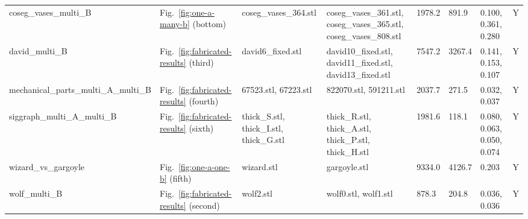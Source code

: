 \begin{tabular}{lllllll}
coseg\_vases\_multi\_B & Fig.~\ref{fig:one-a-many-b} (bottom) & coseg\_vases\_364.stl & coseg\_vases\_361.stl, coseg\_vases\_365.stl, coseg\_vases\_808.stl & 1978.2 & 891.9 & 0.100, 0.361, 0.280 & Y \\
david\_multi\_B & Fig.~\ref{fig:fabricated-results} (third) & david6\_fixed.stl & david10\_fixed.stl, david11\_fixed.stl, david13\_fixed.stl & 7547.2 & 3267.4 & 0.141, 0.153, 0.107 & Y \\
mechanical\_parts\_multi\_A\_multi\_B & Fig.~\ref{fig:fabricated-results} (fourth) & 67523.stl, 67223.stl & 822070.stl, 591211.stl & 2037.7 & 271.5 & 0.032, 0.037 & Y \\
siggraph\_multi\_A\_multi\_B & Fig.~\ref{fig:fabricated-results} (sixth) & thick\_S.stl, thick\_I.stl, thick\_G.stl & thick\_R.stl, thick\_A.stl, thick\_P.stl, thick\_H.stl & 1981.6 & 118.1 & 0.080, 0.063, 0.050, 0.074 & Y \\
wizard\_vs\_gargoyle & Fig.~\ref{fig:one-a-one-b} (fifth) & wizard.stl & gargoyle.stl & 9334.0 & 4126.7 & 0.203 & Y \\
wolf\_multi\_B & Fig.~\ref{fig:fabricated-results} (second) & wolf2.stl & wolf0.stl, wolf1.stl & 878.3 & 204.8 & 0.036, 0.036 & Y \\
\bottomrule
\end{tabular}
